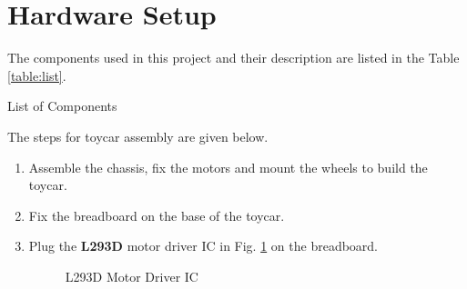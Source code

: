 \documentclass[conference]{IEEEtran}
\begin{document}
\section{Hardware Setup}
%
	The components used in this project and their description are listed in the Table \ref{table:list}.
\begin{table}[!h]
  \centering
  
  \caption{List of Components}
  \label{table:list}
\end{table}
The steps for toycar assembly are given below.
\begin{enumerate}
\item Assemble the chassis, fix the motors and mount the wheels to build the toycar.

\item Fix the breadboard on the base of the toycar.

\item Plug the \textbf{L293D} motor driver IC in Fig. \ref{fig:l293d_ic} on the breadboard.

\begin{figure}[!ht]
\centering
{}%
\caption{L293D Motor Driver IC}
\label{fig:l293d_ic}
\end{figure}


\end{enumerate}
\end{document}
